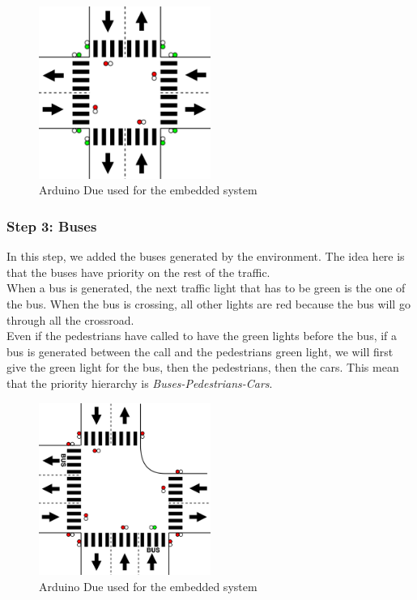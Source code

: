 \begin{figure}[!ht]\label{fig:arduino}
  \centering
    \includegraphics[width=0.5\textwidth]{picture/model/trafficlight_step2_s3.png}
    \caption{Arduino Due used for the embedded system}
\end{figure}

\subsubsection{Step 3: Buses}
In this step, we added the buses generated by the environment. The idea here is that the buses have priority on the rest of the traffic. \\
When a bus is generated, the next traffic light that has to be green is the one of the bus. When the bus is crossing, all other lights are red because the bus will go through all the crossroad. \\
Even if the pedestrians have called to have the green lights before the bus, if a bus is generated between the call and the pedestrians green light, we will first give the green light for the bus, then the pedestrians, then the cars. This mean that the priority hierarchy is \textit{Buses-Pedestrians-Cars}. 


\begin{figure}[!ht]\label{fig:arduino}
  \centering
    \includegraphics[width=0.5\textwidth]{picture/model/trafficlight_step3_s2.png}
    \caption{Arduino Due used for the embedded system}
\end{figure}

